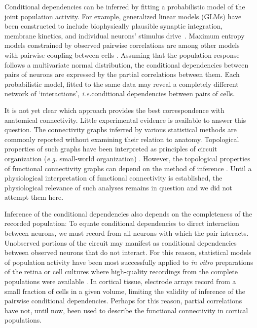 Conditional dependencies can be inferred by fitting a probabilistic model of the joint population activity. For example, generalized linear models (GLMs) have been constructed to  include biophysically plausible synaptic integration, membrane kinetics, and individual neurons' stimulus drive~\cite{Pillow:2008}.  Maximum entropy models constrained by observed pairwise correlations are among other models with pairwise coupling between cells \cite{Schneidman:2006, Tkacik:2006, Yu:2008, Tang:2008, Shlens:2009}.  Assuming that the population response follows a multivariate normal distribution, the conditional dependencies between pairs of neurons are expressed by the partial correlations between them.   Each probabilistic model, fitted to the same data may reveal a completely different network of `interactions',  \emph{i.e.}\;conditional dependencies between pairs of cells.

It is not yet clear which approach provides the best correspondence with anatomical connectivity. Little experimental evidence is available to answer this question.  The connectivity graphs inferred by various statistical methods are commonly reported without examining their relation to anatomy.
Topological properties of such graphs have been interpreted as principles of circuit organization (\emph{e.g.} small-world organization) \cite{Feldt:2011, Yu:2008, Malmersjo:2013, Sadovsky:2014}.  However, the topological properties of functional connectivity graphs can depend on the method of inference \cite{Zalesky:2012}. Until a physiological interpretation of functional connectivity is established, the physiological relevance of such analyses remains in question and we did not attempt them here.

Inference of the conditional dependencies also depends on the completeness of the recorded population:  To equate conditional dependencies to direct interaction between neurons, we must record from all neurons with which the pair interacts. Unobserved portions of the circuit may manifest as conditional dependencies between observed neurons that do not interact. For this reason, statistical models of population activity have been most successfully applied to \emph{in vitro} preparations of the retina or cell cultures where high-quality recordings from the complete populations were available \cite{Pillow:2008}. In cortical tissue, electrode arrays record from a small fraction of cells in a given volume, limiting the validity of inference of the pairwise conditional dependencies. Perhaps for this reason, partial correlations have not, until now, been used to describe the functional connectivity in cortical populations.

